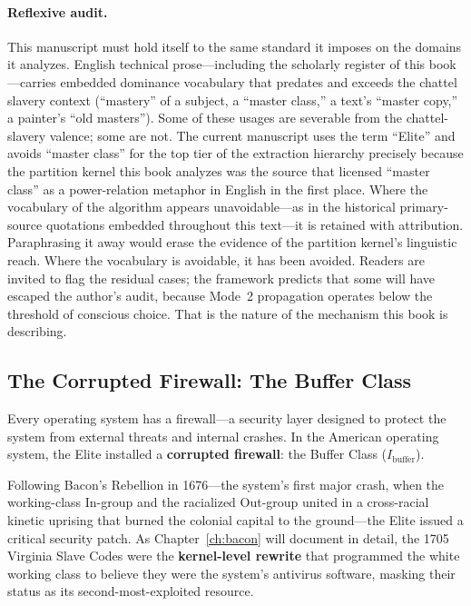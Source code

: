 \paragraph{Reflexive audit.}
This manuscript must hold itself to the same standard it imposes on the domains it analyzes. English technical prose---including the scholarly register of this book---carries embedded dominance vocabulary that predates and exceeds the chattel slavery context (``mastery'' of a subject, a ``master class,'' a text's ``master copy,'' a painter's ``old masters''). Some of these usages are severable from the chattel-slavery valence; some are not. The current manuscript uses the term ``Elite'' and avoids ``master class'' for the top tier of the extraction hierarchy precisely because the partition kernel this book analyzes was the source that licensed ``master class'' as a power-relation metaphor in English in the first place. Where the vocabulary of the algorithm appears unavoidable---as in the historical primary-source quotations embedded throughout this text---it is retained with attribution. Paraphrasing it away would erase the evidence of the partition kernel's linguistic reach. Where the vocabulary is avoidable, it has been avoided. Readers are invited to flag the residual cases; the framework predicts that some will have escaped the author's audit, because Mode~2 propagation operates below the threshold of conscious choice. That is the nature of the mechanism this book is describing.

\subsection{The Corrupted Firewall: The Buffer Class}

Every operating system has a firewall---a security layer designed to protect the system from external threats and internal crashes. In the American operating system, the Elite installed a \textbf{corrupted firewall}: the Buffer Class ($I_{\text{buffer}}$).

Following Bacon's Rebellion in 1676---the system's first major crash, when the working-class In-group and the racialized Out-group united in a cross-racial kinetic uprising that burned the colonial capital to the ground---the Elite issued a critical security patch. As Chapter~\ref{ch:bacon} will document in detail, the 1705 Virginia Slave Codes were the \textbf{kernel-level rewrite} that programmed the white working class to believe they were the system's antivirus software, masking their status as its second-most-exploited resource.

